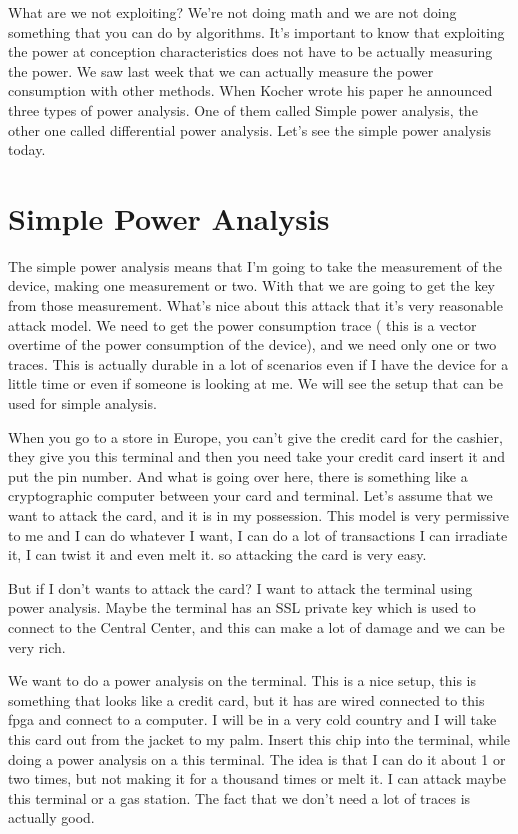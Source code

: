 What are we not exploiting? We're not doing math and we are not doing something
that you can do by algorithms. It's important to know that exploiting the power
at conception characteristics does not have to be actually measuring the power.
We saw last week that we can actually measure the power consumption with other
methods. When Kocher wrote his paper he announced three types of power
analysis. One of them called Simple power analysis, the other one called
differential power analysis. Let's see the simple power analysis today.

\section{Simple Power Analysis}

The simple power analysis means that I'm going to take the measurement of the
device, making one measurement or two. With that we are going to get the key
from those measurement. What's nice about this attack that it's very reasonable
attack model. We need to get the power consumption trace ( this is a vector
overtime of the power consumption of the device), and we need only one or two
traces. This is actually durable in a lot of scenarios even if I have the device
for a little time or even if someone is looking at me. We will see the setup
that can be used for simple analysis. 

When you go to a store in Europe, you can't give the credit card for the
cashier, they give you this terminal and then you need take your credit card
insert it and put the pin number. And what is going over here, there is
something like a cryptographic computer between your card and terminal. Let's
assume that we want to attack the card, and it is in my possession. This model
is very permissive to me and I can do whatever I want, I can do a lot of
transactions I can irradiate it, I can twist it and even melt it. so attacking the
card is very easy.


But if I don't wants to attack the card? I want to attack the terminal using
power analysis. Maybe the terminal has an SSL private key which is used to
connect to the Central Center, and this can make a lot of damage and we can be
very rich.

We want to do a power analysis on the terminal. This is a nice setup, this is
something that looks like a credit card, but it has are wired connected to this
fpga and connect to a computer. I will be in a very cold country and I will take
this card out from the jacket to my palm. Insert this chip into the terminal,
while doing a power analysis on a this terminal. The idea is that I can do it
about 1 or two times, but not making it for a thousand times or melt it. I can
attack maybe this terminal or a gas station. The fact that we don't need a lot
of traces is actually good.

